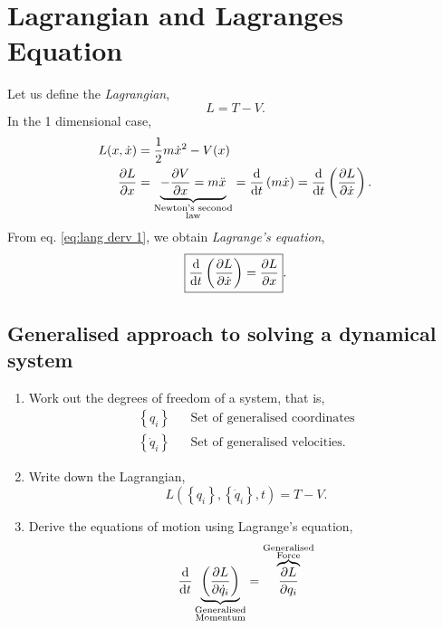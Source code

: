 \documentclass{book}
\begin{document}
\section{Lagrangian and Lagranges Equation}
Let us define the \textit{Lagrangian},
\begin{equation}
	\boxed{L = T - V}.
\end{equation}
In the 1 dimensional case,
\begin{equation}
	\begin{split}
		L(x, \Dot{x}) & = \frac{1}{2}m\Dot{x}^2 - V(x) \\
		\pdv{L}{x} & = \underbrace{-\pdv{V}{x} = m\Ddot{x}}_{\substack{\text{Newton's seconod}\\\text{law}}} = \dv{}{t}\left(m\Dot{x}\right) = \dv{}{t}\left(\pdv{L}{\Dot{x}}\right).
		\end{split} \label{eq:lang derv 1}
\end{equation}
From eq. \eqref{eq:lang derv 1}, we obtain \textit{Lagrange's equation},
\begin{equation}
	\boxed{\dv{t}\left(\pdv{L}{\Dot{x}}\right) = \pdv{L}{x}}.
\end{equation}
\subsection{Generalised approach to solving a dynamical system}
\begin{enumerate}
	\item Work out the degrees of freedom of a system, that is,
	\begin{align}
		\left\{q_i\right\} && \text{Set of generalised coordinates} \\
		\left\{\Dot{q}_i\right\} && \text{Set of generalised velocities}.
	\end{align}
	\item Write down the Lagrangian,
	\begin{equation}
		L\left(\left\{q_i\right\},\left\{\Dot{q}_i\right\},t\right) = T - V.
	\end{equation}
	\item Derive the equations of motion using Lagrange's equation,
	\begin{equation}
		\dv{t}\underbrace{\left(\pdv{L}{\Dot{q}_i}\right)}_{\substack{\text{Generalised}\\\text{Momentum}}} = \overbrace{\pdv{L}{q_i}}^{\substack{\text{Generalised}\\ \text{Force}}} \label{eq: generalised lagrangian}
	\end{equation}
\end{enumerate}
\end{document}
